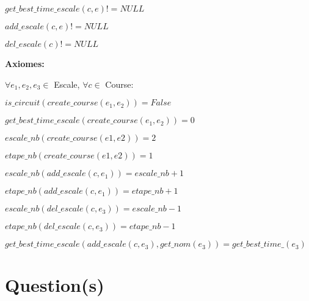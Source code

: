 \documentclass[a4paper, 11pt, oneside]{article}
\begin{document}
\begin{flushleft}
{\begin{minipage}{\textwidth}
      \hspace{0.5cm} $get\_best\_time\_escale(c, e)$\space$!= NULL$

      \hspace{0.5cm} $add\_escale(c, e)$\space$!= NULL$

      \hspace{0.5cm} $del\_escale(c)$\space$!= NULL$

      \textbf{Axiomes:}

      \hspace{0.5cm} $\forall e_1, e_2, e_3 \in$ Escale, $\forall c \in$ Course:

      \hspace{0.5cm} $is\_circuit(create\_course(e_1, e_2)) = False$

      \hspace{0.5cm} $get\_best\_time\_escale(create\_course(e_1, e_2)) = 0$

      \hspace{0.5cm} $escale\_nb(create\_course(e1, e2)) = 2$

      \hspace{0.5cm} $etape\_nb(create\_course(e1, e2)) = 1$

      \hspace{0.5cm} $escale\_nb(add\_escale(c, e_1)) = escale\_nb + 1$

      \hspace{0.5cm} $etape\_nb(add\_escale(c, e_1)) = etape\_nb + 1$

      \hspace{0.5cm} $escale\_nb(del\_escale(c, e_3)) = escale\_nb - 1$

      \hspace{0.5cm} $etape\_nb(del\_escale(c, e_3)) = etape\_nb - 1$

      \hspace{0.5cm} $get\_best\_time\_escale(add\_escale(c, e_3), get\_nom(e_3))
      = get\_best\_time\_(e_3)$ 

      \end{minipage}%
   }
\end{flushleft}

\section{Question(s)}

\end{document}
